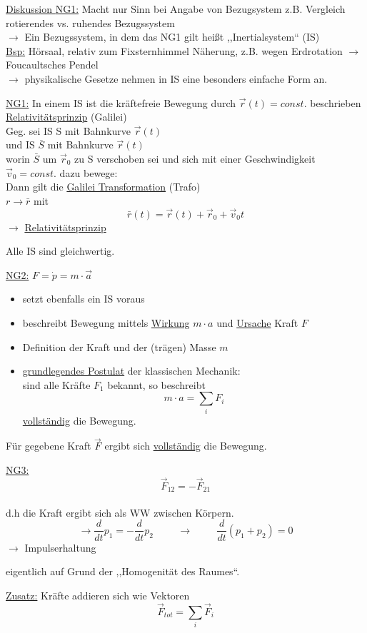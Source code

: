 \documentclass[titlepage,12pt,a4paper,ngerman]{report}
\begin{document}
{\large\underline{Diskussion
	{NG1:}} Macht nur Sinn bei Angabe von Bezugsystem z.B. Vergleich rotierendes vs. ruhendes Bezugssystem\\
$\rightarrow$ Ein Bezugssystem, in dem das NG1 gilt heißt ,,Inertialsystem`` (IS)\\
\underline{Bsp:} Hörsaal, relativ zum Fixsternhimmel
Näherung, z.B. wegen Erdrotation $\rightarrow$ Foucaultsches Pendel\\
$\rightarrow$ physikalische Gesetze nehmen in IS eine besonders einfache Form an.\par
\underline{NG1:} In einem IS ist die kräftefreie Bewegung durch $\vec{r}(t) = const.$ beschrieben
\underline{Relativitätsprinzip} (Galilei)\\
Geg. sei IS S mit Bahnkurve $\vec{r}(t)$\\
und IS $\bar{S}$ mit Bahnkurve $\vec{r}(t)$\\
worin $\bar{S}$ um $\vec{r}_{0}$ zu S verschoben sei und sich mit einer Geschwindigkeit $\vec{v}_{0} = const.$ dazu bewege:\\
Dann gilt die \underline{Galilei Transformation} (Trafo)\\
$ r \rightarrow \bar{r}$ mit
\begin{equation*}
\bar{r} (t) = \vec{r}(t) + \vec{r}_{0} + \vec{v}_{0} t \tag{1}
\end{equation*}
$\rightarrow$ \underline{Relativitätsprinzip}\par
Alle IS sind gleichwertig.\par
{\large\underline{NG2:}} $F = \dot{p} = m \cdot \vec{a}$ %
\begin{itemize}
	\item setzt ebenfalls ein IS voraus
	\item beschreibt Bewegung mittels \underline{Wirkung} $m\cdot a$ und \underline{Ursache} Kraft $F$
	\item Definition der Kraft und der (trägen) Masse $m$
	\item \underline{grundlegendes Postulat} der klassischen Mechanik:\\
	sind alle Kräfte $F_{1}$ bekannt, so beschreibt $$m\cdot a = \sum_{i} F_{i}$$ \underline{vollständig} die Bewegung.
\end{itemize}
Für gegebene Kraft $\vec{F}$ ergibt sich \underline{vollständig} die Bewegung.\par
\underline{NG3:} $$\vec{F}_{12}=-\vec{F}_{21}$$\\
d.h die Kraft ergibt sich als WW zwischen Körpern.\\
$$\rightarrow \frac{d}{dt} p_{1}=-\frac{d}{dt}p_{2} \hspace{1cm} \rightarrow \hspace{1cm} \frac{d}{dt}(p_{1}+p_{2}) =0$$
$\rightarrow$ Impulserhaltung\par
eigentlich auf Grund der ,,Homogenität des Raumes``.\par
\underline{Zusatz:} Kräfte addieren sich wie Vektoren\\
$$ \vec{F}_{tot} = \sum_{i} \vec{F}_{i}$$
}
\end{document}
